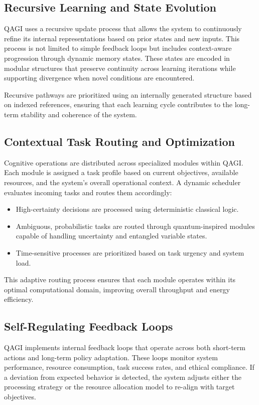 \documentclass{article}
\theoremstyle{plain}
\theoremstyle{claimstyle}
\begin{document}
\subsection{Recursive Learning and State Evolution}

QAGI uses a recursive update process that allows the system to continuously refine its internal representations based on prior states and new inputs. This process is not limited to simple feedback loops but includes context-aware progression through dynamic memory states. These states are encoded in modular structures that preserve continuity across learning iterations while supporting divergence when novel conditions are encountered.

Recursive pathways are prioritized using an internally generated structure based on indexed references, ensuring that each learning cycle contributes to the long-term stability and coherence of the system.

\subsection{Contextual Task Routing and Optimization}

Cognitive operations are distributed across specialized modules within QAGI. Each module is assigned a task profile based on current objectives, available resources, and the system’s overall operational context. A dynamic scheduler evaluates incoming tasks and routes them accordingly:
\begin{itemize}
    \item High-certainty decisions are processed using deterministic classical logic.
    \item Ambiguous, probabilistic tasks are routed through quantum-inspired modules capable of handling uncertainty and entangled variable states.
    \item Time-sensitive processes are prioritized based on task urgency and system load.
\end{itemize}

This adaptive routing process ensures that each module operates within its optimal computational domain, improving overall throughput and energy efficiency.

\subsection{Self-Regulating Feedback Loops}

QAGI implements internal feedback loops that operate across both short-term actions and long-term policy adaptation. These loops monitor system performance, resource consumption, task success rates, and ethical compliance. If a deviation from expected behavior is detected, the system adjusts either the processing strategy or the resource allocation model to re-align with target objectives.
\end{document}
